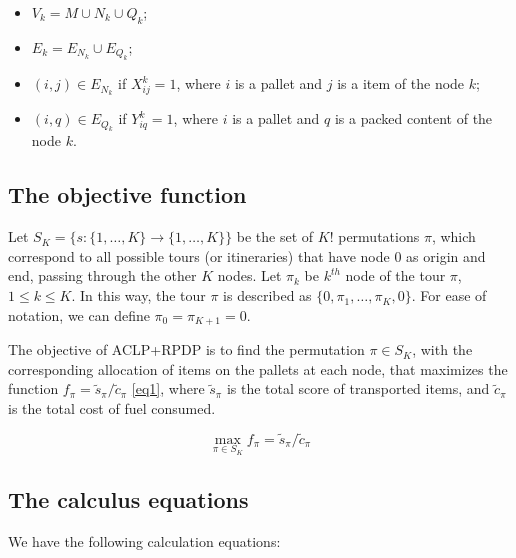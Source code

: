 \documentclass[preprint]{elsarticle}
\begin{document}
\begin{itemize}

\item $V_k = M \cup N_k \cup Q_k$;

\item $E_k = E_{N_k} \cup E_{Q_k}$;

\item $(i, j) \in E_{N_k}$\/ if $X_{ij}^k = 1$, where $i$\/ is a pallet and $j$\/ is a item of the node $k$;

\item $(i, q) \in E_{Q_k}$\/ if $Y_{iq}^k = 1$, where $i$\/ is a pallet and $q$\/ is a packed content of the node $k$.

\end{itemize}

\subsection{The objective function}

Let $S_K = \{s: \{1, \dots, K\} \rightarrow \{1, \dots, K\} \}$\/ be the set of $K!$ permutations $\pi$, which correspond to all possible tours (or itineraries) that have node $0$\/ as origin and end, passing through the other $K$\/ nodes. Let $\pi_k$\/ be $k^{th}$\/ node of the tour $\pi$, $1 \leq k \leq K$. In this way, the tour $\pi$\/ is described as $\{0,\pi_1,\ldots,\pi_K, 0\}$. For ease of notation, we can define $\pi_0 = \pi_{K+1} = 0$.

The objective of ACLP+RPDP is to find the permutation $\pi \in S_K$, with the corresponding allocation of items on the pallets at each node, that maximizes the function $f_\pi = \tilde{s}_\pi/\tilde{c}_\pi$ \ref{eq1}, where $\tilde{s}_\pi$\/ is the total score of transported items, and $\tilde{c}_\pi$\/ is the total cost of fuel consumed. 

\begin{equation} \label{eq1}
	\max_{\pi \in S_K} f_\pi = \tilde{s}_\pi/\tilde{c}_\pi
\end{equation}



\subsection{The calculus equations}


We have the following calculation equations:
\end{document}
